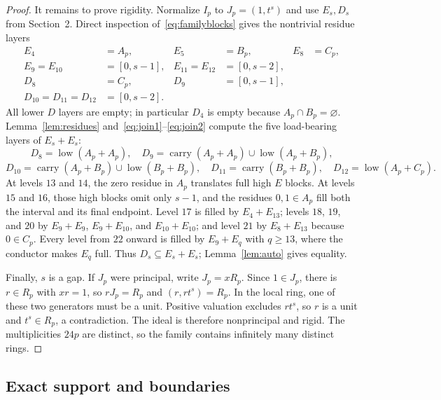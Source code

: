 \documentclass[11pt]{article}
\theoremstyle{definition}
\theoremstyle{remark}
\begin{document}
\begin{proof}
It remains to prove rigidity. Normalize $I_p$ to $J_p=(1,t^s)$ and use $E_s,D_s$ from
Section~2. Direct inspection of~\eqref{eq:familyblocks} gives the nontrivial residue layers
\begin{align*}
E_4&=A_p, & E_5&=B_p, & E_8&=C_p,\\
E_9=E_{10}&=[0,s-1], & E_{11}=E_{12}&=[0,s-2],\\
D_8&=C_p, & D_9&=[0,s-1],\\
D_{10}=D_{11}=D_{12}&=[0,s-2].
\end{align*}
All lower $D$ layers are empty; in particular $D_4$ is empty because $A_p\cap B_p=\varnothing$.
Lemma~\ref{lem:residues} and~\eqref{eq:join1}--\eqref{eq:join2} compute the five load-bearing
layers of $E_s+E_s$:
\[
D_8=\operatorname{low}(A_p+A_p),\quad
D_9=\operatorname{carry}(A_p+A_p)\cup\operatorname{low}(A_p+B_p),
\]
\[
D_{10}=\operatorname{carry}(A_p+B_p)\cup\operatorname{low}(B_p+B_p),\quad
D_{11}=\operatorname{carry}(B_p+B_p),\quad
D_{12}=\operatorname{low}(A_p+C_p).
\]
At levels $13$ and $14$, the zero residue in $A_p$ translates full high $E$ blocks. At levels
$15$ and $16$, those high blocks omit only $s-1$, and the residues $0,1\in A_p$ fill both the
interval and its final endpoint. Level $17$ is filled by $E_4+E_{13}$; levels $18$, $19$, and
$20$ by $E_9+E_9$, $E_9+E_{10}$, and $E_{10}+E_{10}$; and level $21$ by
$E_8+E_{13}$ because $0\in C_p$. Every level from $22$ onward is filled by
$E_9+E_{q}$ with $q\ge13$, where the conductor makes $E_q$ full. Thus
$D_s\subseteq E_s+E_s$; Lemma~\ref{lem:auto} gives equality.

Finally, $s$ is a gap. If $J_p$ were principal, write $J_p=xR_p$. Since $1\in J_p$, there is
$r\in R_p$ with $xr=1$, so $rJ_p=R_p$ and $(r,rt^s)=R_p$. In the local ring, one of these two
generators must be a unit. Positive valuation excludes $rt^s$, so $r$ is a unit and
$t^s\in R_p$, a contradiction. The ideal is therefore nonprincipal and rigid.
The multiplicities $24p$ are distinct, so the family contains infinitely many distinct rings.
\end{proof}

\subsection{Exact support and boundaries}
\end{document}
